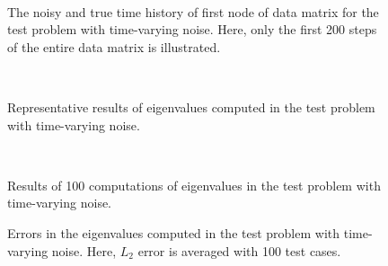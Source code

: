 \documentclass[aip,graphicx]{revtex4-1}
\begin{document}
\begin{figure}
	\\
	\caption{The noisy and true time history of first node of data matrix for the test problem with time-varying noise. Here, only the first 200 steps of the entire data matrix is illustrated. }
	\label{fig:sinhist}
\end{figure}


\begin{figure}
	\\
	\caption{Representative results of eigenvalues computed in the test problem with time-varying noise. }
	\label{fig:sineigenexam}
\end{figure}

\begin{figure}
	\\
    \caption{Results of 100 computations of eigenvalues in the test problem with time-varying noise.}	
	\label{fig:sineigen}
\end{figure}
\begin{figure}
   \caption{Errors in the eigenvalues computed in the test problem with time-varying noise. Here, $L_2$ error is averaged with 100 test cases. }	
   \label{fig:sineigenerror}
\end{figure}
\end{document}
